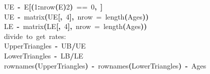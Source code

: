 \documentclass[a4paper]{article}
\newcommand{\hlnumber}[1]{\textcolor[rgb]{0.0823529411764706,0.0784313725490196,0.709803921568627}{#1}}%
\newcommand{\hlfunctioncall}[1]{\textcolor[rgb]{1,0,0}{#1}}%
\newcommand{\hlkeyword}[1]{\textcolor[rgb]{0,0,0}{\textbf{#1}}}%
\newcommand{\hlargument}[1]{\textcolor[rgb]{0.694117647058824,0.247058823529412,0.0196078431372549}{#1}}%
\newcommand{\hlcomment}[1]{\textcolor[rgb]{0.8,0.8,0.8}{#1}}%
\newcommand{\hlassignement}[1]{\textcolor[rgb]{0.215686274509804,0.215686274509804,0.384313725490196}{\textbf{#1}}}%
\newcommand{\hlsymbol}[1]{\textcolor[rgb]{0,0,0}{#1}}%
\newcommand{\hlprompt}[1]{\textcolor[rgb]{0,0,0}{#1}}%
\newcommand{\hlstd}[1]{\textcolor[rgb]{0,0,0}{#1}}%
\newenvironment{Houtput}{\raggedright}{%
%
}
\begin{document}
\begin{Houtput}
\hlstd{}\ttfamily\noindent
\hlprompt{\usebox{\hlnormalsizeboxgreaterthan}{\ }}\hlsymbol{UE}{\ }\hlassignement{\usebox{\hlnormalsizeboxlessthan}-}{\ }\hlsymbol{E}\hlkeyword{[}\hlkeyword{(}\hlnumber{1}\hlkeyword{:}\hlfunctioncall{nrow}\hlkeyword{(}\hlsymbol{E}\hlkeyword{)}\hlkeyword{\usebox{\hlnormalsizeboxpercent}\usebox{\hlnormalsizeboxpercent}}\hlnumber{2}\hlkeyword{)}{\ }=={\ }\hlnumber{0}\hlkeyword{,}{\ }\hlkeyword{]}\mbox{}
\normalfont
\hspace*{\fill}\\
\hlstd{}\ttfamily\noindent
\hlprompt{\usebox{\hlnormalsizeboxgreaterthan}{\ }}\hlsymbol{UE}{\ }\hlassignement{\usebox{\hlnormalsizeboxlessthan}-}{\ }\hlfunctioncall{matrix}\hlkeyword{(}\hlsymbol{UE}\hlkeyword{[}\hlkeyword{,}{\ }\hlnumber{4}\hlkeyword{]}\hlkeyword{,}{\ }\hlargument{nrow}{\ }\hlargument{=}{\ }\hlfunctioncall{length}\hlkeyword{(}\hlsymbol{Ages}\hlkeyword{)}\hlkeyword{)}\mbox{}
\normalfont
\hspace*{\fill}\\
\hlstd{}\ttfamily\noindent
\hlprompt{\usebox{\hlnormalsizeboxgreaterthan}{\ }}\hlsymbol{LE}{\ }\hlassignement{\usebox{\hlnormalsizeboxlessthan}-}{\ }\hlfunctioncall{matrix}\hlkeyword{(}\hlsymbol{LE}\hlkeyword{[}\hlkeyword{,}{\ }\hlnumber{4}\hlkeyword{]}\hlkeyword{,}{\ }\hlargument{nrow}{\ }\hlargument{=}{\ }\hlfunctioncall{length}\hlkeyword{(}\hlsymbol{Ages}\hlkeyword{)}\hlkeyword{)}\mbox{}
\normalfont
\hspace*{\fill}\\
\hlstd{}\ttfamily\noindent
\hlprompt{\usebox{\hlnormalsizeboxgreaterthan}{\ }}\hlcomment{\usebox{\hlnormalsizeboxhash}{\ }divide{\ }to{\ }get{\ }rates:}\mbox{}
\normalfont
\hspace*{\fill}\\
\hlstd{}\ttfamily\noindent
\hlprompt{\usebox{\hlnormalsizeboxgreaterthan}{\ }}\hlsymbol{UpperTriangles}{\ }\hlassignement{\usebox{\hlnormalsizeboxlessthan}-}{\ }\hlsymbol{UB}\hlkeyword{/}\hlsymbol{UE}\mbox{}
\normalfont
\hspace*{\fill}\\
\hlstd{}\ttfamily\noindent
\hlprompt{\usebox{\hlnormalsizeboxgreaterthan}{\ }}\hlsymbol{LowerTriangles}{\ }\hlassignement{\usebox{\hlnormalsizeboxlessthan}-}{\ }\hlsymbol{LB}\hlkeyword{/}\hlsymbol{LE}\mbox{}
\normalfont
\hspace*{\fill}\\
\hlstd{}\ttfamily\noindent
\hlprompt{\usebox{\hlnormalsizeboxgreaterthan}{\ }}\hlfunctioncall{rownames}\hlkeyword{(}\hlsymbol{UpperTriangles}\hlkeyword{)}{\ }\hlassignement{\usebox{\hlnormalsizeboxlessthan}-}{\ }\hlfunctioncall{rownames}\hlkeyword{(}\hlsymbol{LowerTriangles}\hlkeyword{)}{\ }\hlassignement{\usebox{\hlnormalsizeboxlessthan}-}{\ }\hlsymbol{Ages}\mbox{}

\end{Houtput}
\end{document}
